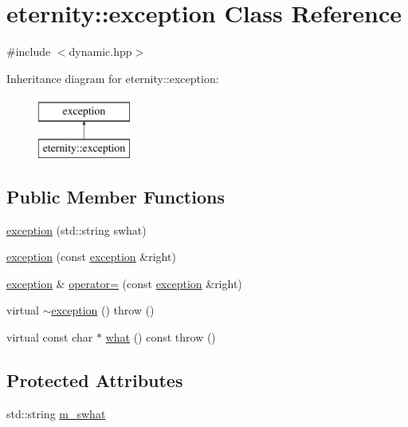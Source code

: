 \hypertarget{classeternity_1_1exception}{}\section{eternity\+:\+:exception Class Reference}
\label{classeternity_1_1exception}


{\ttfamily \#include $<$dynamic.\+hpp$>$}

Inheritance diagram for eternity\+:\+:exception\+:\begin{figure}[H]
\begin{center}
\leavevmode
\includegraphics[height=2.000000cm]{classeternity_1_1exception}
\end{center}
\end{figure}
\subsection*{Public Member Functions}
\begin{DoxyCompactItemize}
\item 
\hyperlink{classeternity_1_1exception_a681b708eb4c5870221307180d685ea0f}{exception} (std\+::string swhat)
\item 
\hyperlink{classeternity_1_1exception_a68454ae0f538c10f63380c6d9954acab}{exception} (const \hyperlink{classeternity_1_1exception}{exception} \&right)
\item 
\hyperlink{classeternity_1_1exception}{exception} \& \hyperlink{classeternity_1_1exception_a9723617b72c37884f532451c578a3d39}{operator=} (const \hyperlink{classeternity_1_1exception}{exception} \&right)
\item 
virtual \hyperlink{classeternity_1_1exception_a88196166c38b9b66d790cf94be058e18}{$\sim$exception} ()  throw ()
\item 
virtual const char $\ast$ \hyperlink{classeternity_1_1exception_a5267219aab7b3bd423a6a751939928a6}{what} () const  throw ()
\end{DoxyCompactItemize}
\subsection*{Protected Attributes}
\begin{DoxyCompactItemize}
\item 
std\+::string \hyperlink{classeternity_1_1exception_ad3190da518fc2bb1dcc50fa665176036}{m\+\_\+swhat}
\end{DoxyCompactItemize}


